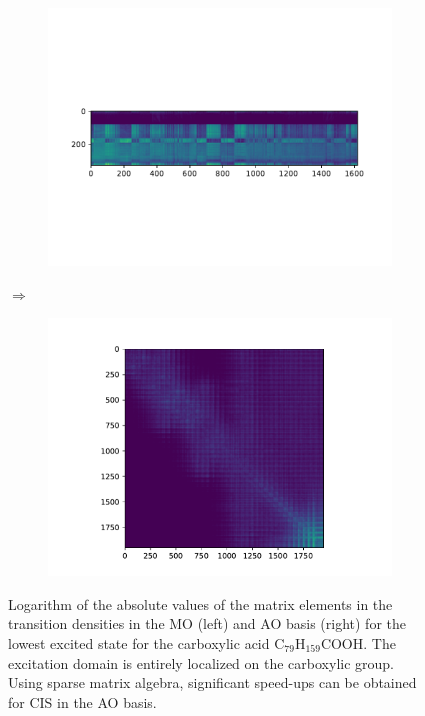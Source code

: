 \begin{figure}
\centering
\begin{subfigure}{0.4\textwidth}
\centering
\includegraphics[width=\textwidth]{Pics/CISDENSE}
\caption{}
\end{subfigure}
$\Longrightarrow$
\begin{subfigure}{0.5\textwidth}
\centering
\includegraphics[width=\textwidth]{Pics/CIS}
\caption{}
\end{subfigure}
\caption[Logarithm of the absolute values of the matrix elements in the transition densities in the MO and AO basis for the lowest excited state for the carboxylic acid C$_{79}$H$_{159}$COOH.]{Logarithm of the absolute values of the matrix elements in the transition densities in the MO (left) and AO basis (right) for the lowest excited state for the carboxylic acid C$_{79}$H$_{159}$COOH. The excitation domain is entirely localized on the carboxylic group. Using sparse matrix algebra, significant speed-ups can be obtained for CIS in the AO basis.}
\label{fig:CISDENSE}
\end{figure}

